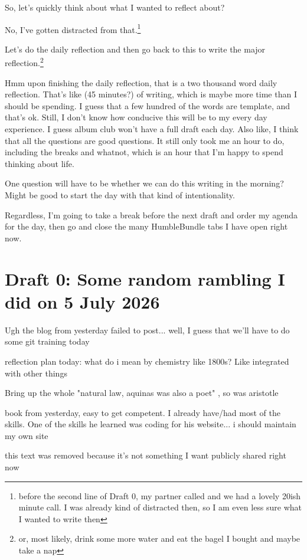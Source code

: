 \documentclass[12pt]{article}
\renewcommand{\,}{\textsuperscript{,}}
\begin{document}
So, let's quickly think about what I wanted to reflect about?

No, I've gotten distracted from that.\footnote{before the second line of Draft 0, my partner called and we had a lovely 20ish minute call. I was already kind of distracted then, so I am even less sure what I wanted to write then}

Let's do the daily reflection and then go back to this to write the major reflection.\footnote{or, most likely, drink some more water and eat the bagel I bought and maybe take a nap}

Hmm upon finishing the daily reflection, that is a two thousand word daily reflection. That's like (45 minutes?) of writing, which is maybe more time than I should be spending. I guess that a few hundred of the words are template, and that's ok. Still, I don't know how conducive this will be to my every day experience. I guess album club won't have a full draft each day. Also like, I think that all the questions are good questions. It still only took me an hour to do, including the breaks and whatnot, which is an hour that I'm happy to spend thinking about life.

One question will have to be whether we can do this writing in the morning? Might be good to start the day with that kind of intentionality.

Regardless, I'm going to take a break before the next draft and order my agenda for the day, then go and close the many HumbleBundle tabs I have open right now.

\section{Draft 0: Some random rambling I did on 5 July 2026}

Ugh the blog from yesterday failed to post... well, I guess that we'll have to do some git training today

reflection plan today: what do i mean by chemistry like 1800s? Like integrated with other things

Bring up the whole "natural law, aquinas was also a poet" , so was aristotle

book from yesterday, easy to get competent. I already have/had most of the skills.  
One of the skills he learned was coding for his website... i should maintain my own site

\langle this text was removed because it's not something I want publicly shared right now \rangle
\end{document}
